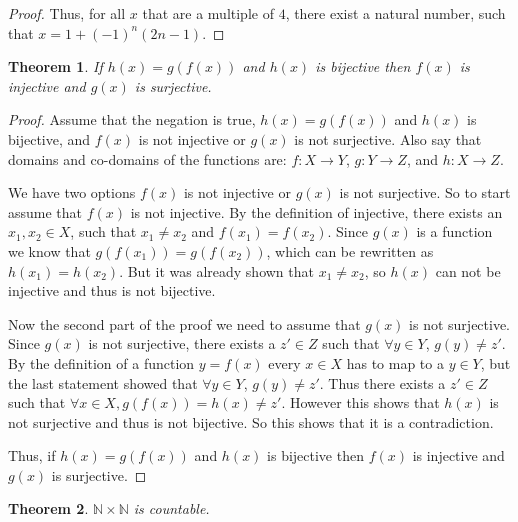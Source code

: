 \documentclass{article}
\newtheorem{theorem}{Theorem}
\begin{document}
\begin{proof}
    Thus, for all $x$ that are a multiple of $4$, there exist a natural number, such that $x= 1 + (-1)^n(2n-1)$. 

\end{proof}

\pagebreak
\begin{theorem}
    If $h(x) = g(f(x))$ and $h(x)$ is bijective then $f(x)$ is injective and $g(x)$ is surjective.
\end{theorem}

    

\begin{proof}
    Assume that the negation is true, $h(x) = g(f(x))$ and $h(x)$ is bijective, and  $f(x)$ is not injective or $g(x)$ is not surjective. Also say that domains and co-domains of the functions are: $f:X\xrightarrow{}Y$, $g:Y\xrightarrow{}Z$, and $h:X\xrightarrow{}Z$.
    
    We have two options $f(x)$ is not injective or $g(x)$ is not surjective. So to start assume that $f(x)$ is not injective. By the definition of injective, there exists an $x_1,x_2\in X$, such that $x_1\neq x_2$ and $f(x_1)=f(x_2)$. Since $g(x)$ is a function we know that $g(f(x_1))=g(f(x_2))$, which can be rewritten as  $h(x_1) = h(x_2)$. But it was already shown that $x_1\neq x_2$, so $h(x)$ can not be injective and thus is not bijective.
    
    Now the second part of the proof we need to assume that $g(x)$ is not surjective. Since $g(x)$ is not surjective, there exists a $z'\in Z$ such that $\forall y\in Y$, $g(y)\neq z'$.  By the definition of a function $y = f(x)$ every $x\in X$ has to map to a $y\in Y$, but the last statement showed that $\forall y\in Y$, $g(y)\neq z'$. Thus there exists a $z'\in Z$ such that  $\forall x\in X, g(f(x)) = h(x) \neq z'$. However this shows that $h(x)$ is not surjective and thus is not bijective. So this shows that it is a contradiction.
    
    Thus, if $h(x) = g(f(x))$ and $h(x)$ is bijective then $f(x)$ is injective and $g(x)$ is surjective.       
\end{proof}

\pagebreak
\begin{theorem}
    $\mathbb{N}\times\mathbb{N}$ is countable.
\end{theorem}
\end{document}
